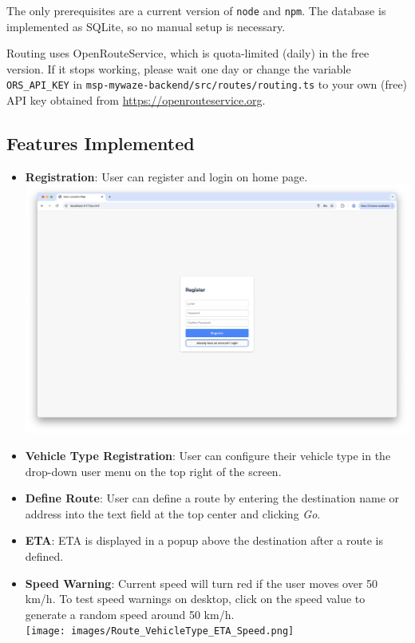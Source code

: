 \documentclass{article}
\begin{document}
The only prerequisites are a current version of \texttt{node} and \texttt{npm}. The database is implemented as SQLite, so no manual setup is necessary.

Routing uses OpenRouteService, which is quota-limited (daily) in the free version. If it stops working, please wait one day or change the variable \texttt{ORS\_API\_KEY} in \texttt{msp-mywaze-backend/src/routes/routing.ts} to your own (free) API key obtained from \url{https://openrouteservice.org}.

\subsection*{Features Implemented}

\begin{itemize}
    \item \textbf{Registration}: User can register and login on home page.\\[0.5em]
    \includegraphics[width=\textwidth]{images/Registration.png}

    \item \textbf{Vehicle Type Registration}: User can configure their vehicle type in the drop-down user menu on the top right of the screen.

    \item \textbf{Define Route}: User can define a route by entering the destination name or address into the text field at the top center and clicking \textit{Go}.

    \item \textbf{ETA}: ETA is displayed in a popup above the destination after a route is defined.

    \item \textbf{Speed Warning}: Current speed will turn red if the user moves over 50 km/h. To test speed warnings on desktop, click on the speed value to generate a random speed around 50 km/h.\\[0.5em]
    \texttt{[image: images/Route\_VehicleType\_ETA\_Speed.png]}
\end{itemize}
\end{document}
